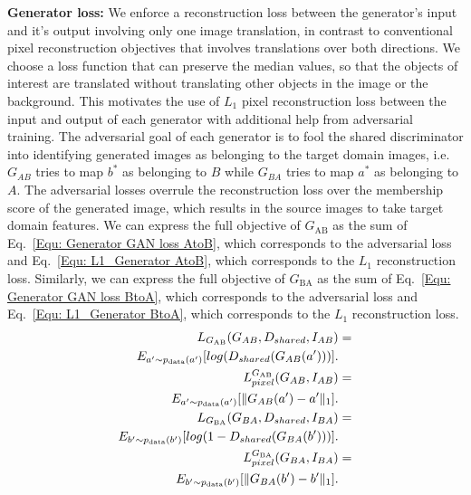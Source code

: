 \documentclass[a4paper,twoside]{article}
\begin{document}
\noindent\textbf{Generator loss:}
We enforce a reconstruction loss between the generator's input and it's output involving only one image translation, in contrast to conventional pixel reconstruction objectives that involves translations over both directions. We choose a loss function that can preserve the median values, so that the objects of interest are translated without translating other objects in the image or the background. This motivates the use of $L_1$ pixel reconstruction loss between the input and output of each generator with additional help from adversarial training. The adversarial goal of each generator is to fool the shared discriminator into identifying generated images as belonging to the target domain images, i.e. $G_{AB}$ tries to map $b^*$ as belonging to $B$ while $G_{BA}$ tries to map $a^*$ as belonging to $A$. The adversarial losses overrule the reconstruction loss over the membership score of the generated image, which results in the source images to take target domain features. We can express the full objective of $G_{\text{AB}}$ as the sum of Eq.~\ref{Equ: Generator GAN loss AtoB}, which corresponds to the adversarial loss and Eq.~\ref{Equ: L1_Generator AtoB}, which corresponds to the $L_1$ reconstruction loss. Similarly, we can express the full objective of $G_{\text{BA}}$ as the sum of Eq.~\ref{Equ: Generator GAN loss BtoA}, which corresponds to the adversarial loss and Eq.~\ref{Equ: L1_Generator BtoA}, which corresponds to the $L_1$ reconstruction loss.
\begin{align}
{L}_{{G_{\text{AB}}}}(G_{AB},D_{shared}, I_{AB}) &=  \nonumber\\
{E}_{a'\sim{p_{\rm data}}(a')}[log(D_{shared}(G_{AB}(a')))].
\label{Equ: Generator GAN loss AtoB}
\\
{L}_{pixel}^{G_{\text{AB}}}(G_{AB}, I_{AB}) &= \nonumber\\
{E}_{a'\sim{p_{\rm data}}(a')}[\Arrowvert G_{AB}(a')-a'\Arrowvert_1].
\label{Equ: L1_Generator AtoB}
\\
{L}_{G_{\text{BA}}}(G_{BA}, D_{shared}, I_{BA}) &= \nonumber\\ {E}_{b'\sim{p_{\rm data}}(b')}[log(1 - D_{shared}(G_{BA}(b')))].
\label{Equ: Generator GAN loss BtoA}
\\
{L}_{pixel}^{G_{\text{BA}}}(G_{BA},I_{BA}) &= \nonumber\\
{E}_{b'\sim{p_{\rm data}}(b')}[\Arrowvert G_{BA}(b')-b'\Arrowvert_1].
\label{Equ: L1_Generator BtoA}
\end{align}
\end{document}
